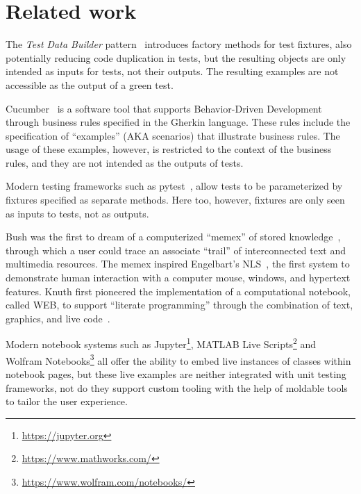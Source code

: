 \documentclass[sigplan,anonymous,review,10pt]{acmart}
\begin{document}


\section{Related work}\label{sec:related}

The \emph{Test Data Builder} pattern~\cite{Free09a} introduces factory methods for test fixtures, also potentially reducing code duplication in tests, but the resulting objects are only intended as inputs for tests, not their outputs.
The resulting examples are not accessible as the output of a green test.

Cucumber~\cite{Hell17a} is a software tool that supports Behavior-Driven Development through business rules specified in the Gherkin language.
These rules include the specification of ``examples'' (AKA scenarios) that illustrate business rules.
The usage of these examples, however, is restricted to the context of the business rules, and they are not intended as the outputs of tests.

Modern testing frameworks such as pytest~\cite{Okke22a}, allow tests to be parameterized by fixtures specified as separate methods.
Here too, however, fixtures are only seen as inputs to tests, not as outputs.


Bush was the first to dream of a computerized ``memex'' of stored knowledge~\cite{Bush45a}, through which a user could trace an associate ``trail'' of interconnected text and multimedia resources.
The memex inspired Engelbart's NLS~\cite{Enge68a}, the first system to demonstrate human interaction with a computer mouse, windows, and hypertext features.
Knuth first pioneered the implementation of a computational notebook, called WEB, to support ``literate programming'' through the combination of text, graphics, and live code~\cite{Knut97a}.

Modern notebook systems such as Jupyter\footnote{\url{https://jupyter.org}}, MATLAB Live Scripts\footnote{\url{https://www.mathworks.com/}} and Wolfram Notebooks\footnote{\url{https://www.wolfram.com/notebooks/}} all offer the ability to embed live instances of classes within notebook pages, but these live examples are neither integrated with unit testing frameworks, not do they support custom tooling with the help of moldable tools to tailor the user experience.
\end{document}
